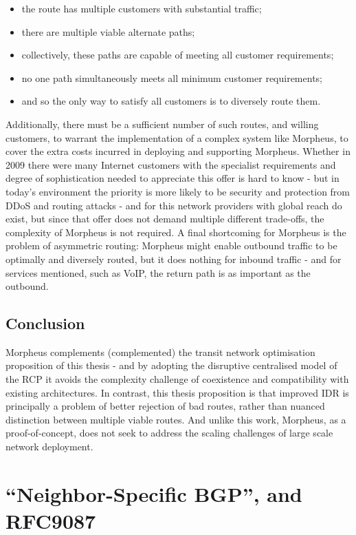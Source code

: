 \begin{itemize}
    \item the route has multiple customers with substantial traffic;
    \item there are multiple viable alternate paths;
    \item collectively, these paths are capable of meeting all customer requirements;
    \item no one path simultaneously meets all minimum customer requirements;
    \item and so the only way to satisfy all customers is to diversely route them.
\end{itemize}

Additionally, there must be a sufficient number of such routes, and willing customers, to warrant the implementation of a complex system like Morpheus, to cover the extra costs incurred in deploying and supporting Morpheus.
Whether in 2009 there were many Internet customers with the specialist requirements and degree of sophistication needed to appreciate this offer is hard to know - but in today's environment the priority is more likely to be security and protection from DDoS and routing attacks - and for this network providers with global reach do exist, but since that offer does not demand multiple different trade-offs, the complexity of Morpheus is not required.
A final shortcoming for Morpheus is the problem of asymmetric routing: Morpheus might enable outbound traffic to be optimally and diversely routed, but it does nothing for inbound traffic - and for services mentioned, such as VoIP, the return path is as important as the outbound.
\subsection{Conclusion}
Morpheus complements (complemented) the transit network optimisation proposition of this thesis - and by adopting the disruptive centralised model of the RCP it avoids the complexity challenge of coexistence and compatibility with existing architectures.
In contrast, this thesis proposition is that improved IDR is principally a problem of better rejection of bad routes, rather than nuanced distinction between multiple viable routes.
And unlike this work, Morpheus, as a proof-of-concept, does not seek to address the scaling challenges of large scale network deployment.

\section{``Neighbor-Speciﬁc BGP'', and RFC9087}


